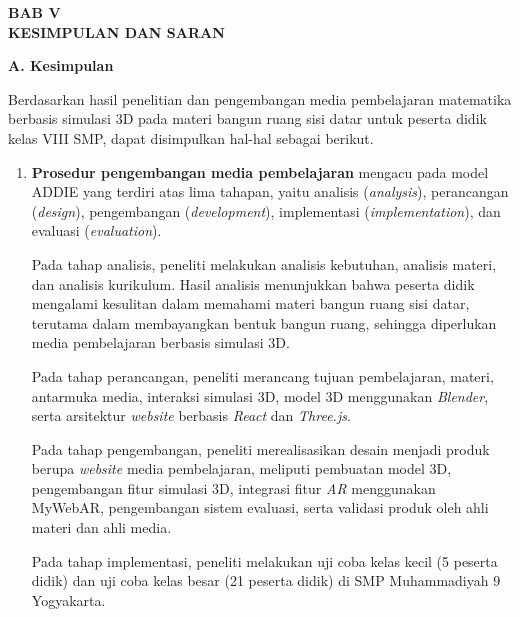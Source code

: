 \newpage
\begin{center}
    \textbf{BAB V} \\
    \textbf{KESIMPULAN DAN SARAN}
\end{center}

\textbf{A. Kesimpulan}

\hspace*{1cm}Berdasarkan hasil penelitian dan pengembangan media pembelajaran matematika berbasis simulasi 3D pada materi bangun ruang sisi datar untuk peserta didik kelas VIII SMP, dapat disimpulkan hal-hal sebagai berikut.

\begin{enumerate}
    \item \textbf{Prosedur pengembangan media pembelajaran} mengacu pada model ADDIE yang terdiri atas lima tahapan, yaitu analisis (\textit{analysis}), perancangan (\textit{design}), pengembangan (\textit{development}), implementasi (\textit{implementation}), dan evaluasi (\textit{evaluation}). 
    
    \hspace*{1cm}Pada tahap analisis, peneliti melakukan analisis kebutuhan, analisis materi, dan analisis kurikulum. Hasil analisis menunjukkan bahwa peserta didik mengalami kesulitan dalam memahami materi bangun ruang sisi datar, terutama dalam membayangkan bentuk bangun ruang, sehingga diperlukan media pembelajaran berbasis simulasi 3D.
    
    \hspace*{1cm}Pada tahap perancangan, peneliti merancang tujuan pembelajaran, materi, antarmuka media, interaksi simulasi 3D, model 3D menggunakan \textit{Blender}, serta arsitektur \textit{website} berbasis \textit{React} dan \textit{Three.js}.
    
    \hspace*{1cm}Pada tahap pengembangan, peneliti merealisasikan desain menjadi produk berupa \textit{website} media pembelajaran, meliputi pembuatan model 3D, pengembangan fitur simulasi 3D, integrasi fitur \textit{AR} menggunakan MyWebAR, pengembangan sistem evaluasi, serta validasi produk oleh ahli materi dan ahli media.
    
    \hspace*{1cm}Pada tahap implementasi, peneliti melakukan uji coba kelas kecil (5 peserta didik) dan uji coba kelas besar (21 peserta didik) di SMP Muhammadiyah 9 Yogyakarta.
    

\end{enumerate}
